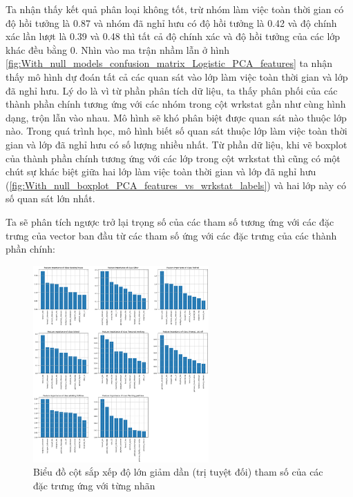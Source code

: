 \begin{enumerate}[label=(\alph*)]
    Ta nhận thấy kết quả phân loại không tốt, trừ nhóm làm việc toàn thời gian có độ hồi tưởng là 0.87 và nhóm đã nghỉ hưu có độ hồi tưởng là 0.42 và độ chính xác lần lượt là 0.39 và 0.48 thì tất cả độ chính xác và độ hồi tưởng của các lớp khác đều bằng 0.
    Nhìn vào ma trận nhầm lẫn ở hình \ref{fig:With_null_models_confusion_matrix_Logistic_PCA_features} ta nhận thấy mô hình dự đoán tất cả các quan sát vào lớp làm việc toàn thời gian và lớp đã nghỉ hưu.
    Lý do là vì từ phần phân tích dữ liệu, ta thấy phân phối của các thành phần chính tương ứng với các nhóm trong cột wrkstat gần như cùng hình dạng, trộn lẫn vào nhau.
    Mô hình sẽ khó phân biệt được quan sát nào thuộc lớp nào.
    Trong quá trình học, mô hình biết số quan sát thuộc lớp làm việc toàn thời gian và lớp đã nghỉ hưu có số lượng nhiều nhất.
    Từ phần dữ liệu, khi vẽ boxplot của thành phần chính tương ứng với các lớp trong cột wrkstat thì cũng có một chút sự khác biệt giữa hai lớp làm việc toàn thời gian và lớp đã nghỉ hưu (\ref{fig:With_null_boxplot_PCA_features_vs_wrkstat_labels}) và hai lớp này có số quan sát lớn nhất.

    Ta sẽ phân tích ngược trở lại trọng số của các tham số tương ứng với các đặc trưng của vector ban đầu từ các tham số ứng với các đặc trưng của các thành phần chính:

    \begin{figure}[H]
        \centering
        \includegraphics[width=0.6\textwidth]{figures/Thanh/Models/Logistic/With_null_models_Feature_Importance_Logistic_PCA_features.png}
        \caption{Biểu đồ cột sắp xếp độ lớn giảm dần (trị tuyệt đối) tham số của các đặc trưng ứng với từng nhãn}
        \label{fig:With_null_models_Feature_Importance_Logistic_PCA_features}
    \end{figure}


\end{enumerate}
